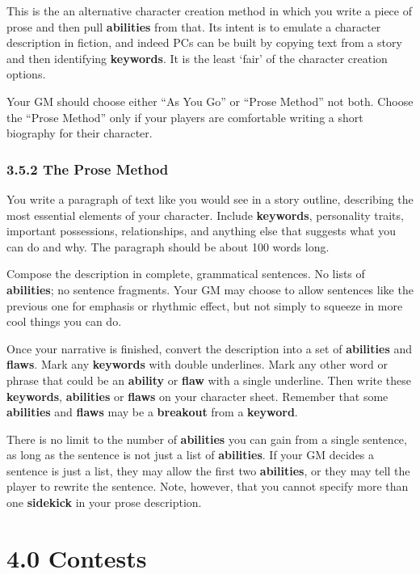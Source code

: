 \documentclass[
  11pt,
]{article}
\begin{document}
This is the an alternative character creation method in which you write
a piece of prose and then pull \textbf{abilities} from that. Its intent
is to emulate a character description in fiction, and indeed PCs can be
built by copying text from a story and then identifying
\textbf{keywords}. It is the least `fair' of the character creation
options.

Your GM should choose either ``As You Go'' or ``Prose Method'' not both.
Choose the ``Prose Method'' only if your players are comfortable writing
a short biography for their character.

\hypertarget{the-prose-method}{%
\subsubsection{3.5.2 The Prose Method}\label{the-prose-method}}

You write a paragraph of text like you would see in a story outline,
describing the most essential elements of your character. Include
\textbf{keywords}, personality traits, important possessions,
relationships, and anything else that suggests what you can do and why.
The paragraph should be about 100 words long.

Compose the description in complete, grammatical sentences. No lists of
\textbf{abilities}; no sentence fragments. Your GM may choose to allow
sentences like the previous one for emphasis or rhythmic effect, but not
simply to squeeze in more cool things you can do.

Once your narrative is finished, convert the description into a set of
\textbf{abilities} and \textbf{flaws}. Mark any \textbf{keywords} with
double underlines. Mark any other word or phrase that could be an
\textbf{ability} or \textbf{flaw} with a single underline. Then write
these \textbf{keywords}, \textbf{abilities} or \textbf{flaws} on your
character sheet. Remember that some \textbf{abilities} and
\textbf{flaws} may be a \textbf{breakout} from a \textbf{keyword}.

There is no limit to the number of \textbf{abilities} you can gain from
a single sentence, as long as the sentence is not just a list of
\textbf{abilities}. If your GM decides a sentence is just a list, they
may allow the first two \textbf{abilities}, or they may tell the player
to rewrite the sentence. Note, however, that you cannot specify more
than one \textbf{sidekick} in your prose description.

\hypertarget{contests}{%
\section{4.0 Contests}\label{contests}}
\end{document}
